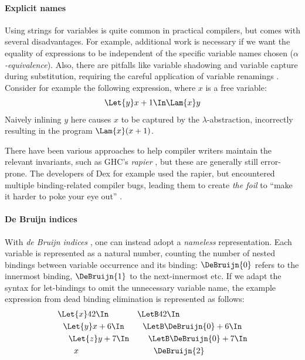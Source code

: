   \paragraph{Explicit names}
    Using strings for variables is quite common in practical compilers,
    but comes with several disadvantages.
    For example, additional work is necessary
    if we want the equality of expressions to be independent of the specific variable names chosen
    (\emph{$\alpha$-equivalence}).
    Also, there are pitfalls like variable shadowing and variable capture during substitution,
    requiring the careful application of variable renamings
    \cite{Barendregt1985LambdaCalculus}.
    Consider for example the following expression, where $x$ is a free variable:
    \begin{align*}
      \Let{y} x + 1 \In \Lam{x} y
    \end{align*}
    Naively inlining $y$ here causes $x$ to be captured
    by the $\lambda$-abstraction, incorrectly resulting in the program
    $\Lam{x} (x + 1)$.

    There have been various approaches to help compiler writers
    maintain the relevant invariants,
    such as GHC's \emph{rapier} \cite{Jones2002GHCInliner},
    but these are generally still error-prone.
    The developers of Dex for example used the rapier,
    but encountered multiple binding-related compiler bugs,
    leading them to create \emph{the foil}
    to ``make it harder to poke your eye out''
    \cite{Maclaurin2022Foil}.

  \paragraph{De Bruijn indices}
    With \emph{de Bruijn indices}
    \cite{DeBruijn1972NamelessIndices},
    one can instead adopt a \emph{nameless} representation.
    Each variable is represented as a natural number,
    counting the number of nested bindings between variable occurrence and its binding:
    $\DeBruijn{0}$ refers to the innermost binding, $\DeBruijn{1}$ to the next-innermost etc.
    If we adapt the syntax for let-bindings to omit the unnecessary variable name,
    the example expression from dead binding elimination is represented as follows:
    \begin{align*}
      &\Let{x} 42 \In            & &\LetB 42 \In                       \\
      &\ \ \Let{y} x + 6 \In     & &\ \ \LetB \DeBruijn{0} + 6 \In     \\
      &\ \ \ \ \Let{z} y + 7 \In & &\ \ \ \ \LetB \DeBruijn{0} + 7 \In \\
      &\ \ \ \ \ \ x             & &\ \ \ \ \ \ \DeBruijn{2}
    \end{align*}

